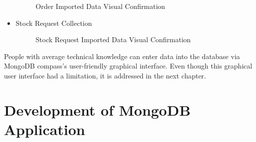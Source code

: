 \documentclass[a4Paper,12pt]{report}
\begin{document}
\begin{itemize}
\begin{figure}[H]
\caption{Order Imported Data Visual Confirmation}
\end{figure}
\item Stock Request Collection
\begin{figure}[H]
\centering
{}
\caption{Stock Request Imported Data Visual Confirmation}
\end{figure}
\end{itemize}
People with average technical knowledge can enter data into the database via MongoDB compass’s user-friendly graphical interface. Even though this graphical user interface had a limitation, it is addressed in the next chapter.
\chapter{Development of MongoDB Application}
\end{document}
